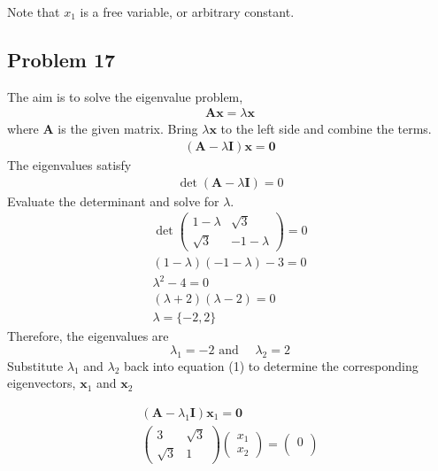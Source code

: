 \documentclass[12pt]{article}
\begin{document}
Note that \(x_{1}\) is a free variable, or arbitrary constant.
\subsection*{Problem 17}
\label{sec:org075b7d6}
   The aim is to solve the eigenvalue problem,
\begin{align*}
\mathbf{A x}=\lambda \mathbf{x}
\end{align*}
where \(\mathbf{A}\) is the given matrix. Bring \(\lambda \mathbf{x}\) to the left side and combine the terms.
\begin{align*}
(\mathbf{A}-\lambda \mathbf{I}) \mathbf{x}=\mathbf{0}
\end{align*}
The eigenvalues satisfy
\begin{align*}
\operatorname{det}(\mathbf{A}-\lambda \mathbf{I})=0
\end{align*}
Evaluate the determinant and solve for \(\lambda\).
\begin{equation*}
  \begin{array}{c}
    \operatorname{det}\left(\begin{array}{cc}
                              1-\lambda & \sqrt{3} \\
                              \sqrt{3} & -1-\lambda
                            \end{array}\right)=0 \\
    (1-\lambda)(-1-\lambda)-3=0 \\
    \lambda^{2}-4=0 \\
    (\lambda+2)(\lambda-2)=0 \\
    \lambda=\{-2,2\}
  \end{array}
\end{equation*}
Therefore, the eigenvalues are
\begin{equation*}
\lambda_{1}=-2 \text { and } \quad \lambda_{2}=2
\end{equation*}
Substitute \(\lambda_{1}\) and \(\lambda_{2}\) back into equation (1) to determine
the corresponding eigenvectors, \(\mathbf{x}_{1}\) and \(\mathbf{x}_{2}\)

\begin{equation*}
	\begin{array}{c}
		\left(\mathbf{A}-\lambda_{1} \mathbf{I}\right) \mathbf{x}_{1}=\mathbf{0} \\
		\left(\begin{array}{cc}
				3        & \sqrt{3} \\
				\sqrt{3} & 1
			\end{array}\right)\left(\begin{array}{l}
				x_{1} \\
				x_{2}
			\end{array}\right)=\left(\begin{array}{l}
				0 \\

			\end{array}\right)
	\end{array}
\end{equation*}
\end{document}
